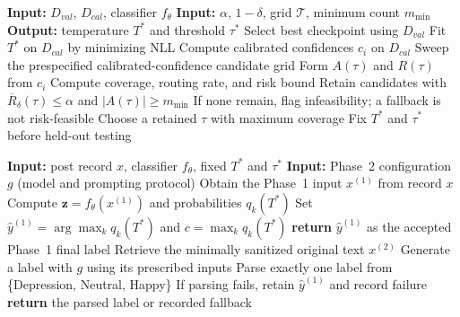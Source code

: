 \documentclass{ieeeaccess}
\begin{document}
\begin{algorithm}[t]
\caption{Calibrated confidence-guided routing}
\label{alg:confidence-routing}
\footnotesize
\begin{algorithmic}[1]
\State \textbf{Input:} $D_{val}$, $D_{cal}$, classifier $f_{\theta}$
\State \textbf{Input:} $\alpha$, $1-\delta$, grid $\mathcal{T}$, minimum count $m_{\min}$
\State \textbf{Output:} temperature $T^*$ and threshold $\tau^*$
\State Select best checkpoint using $D_{val}$
\State Fit $T^*$ on $D_{cal}$ by minimizing NLL
\State Compute calibrated confidences $c_i$ on $D_{cal}$
\State Sweep the prespecified calibrated-confidence candidate grid
    \State Form $A(\tau)$ and $R(\tau)$ from $c_i$
    \State Compute coverage, routing rate, and risk bound
\EndFor
\State Retain candidates with $\overline{R}_{\delta}(\tau)\leq\alpha$ and $|A(\tau)|\geq m_{\min}$
\State If none remain, flag infeasibility; a fallback is not risk-feasible
\State Choose a retained $\tau$ with maximum coverage
\State Fix $T^*$ and $\tau^*$ before held-out testing
\end{algorithmic}
\end{algorithm}

\begin{algorithm}[t]
\caption{Two-phase inference with fixed calibrated routing policy}
\label{alg:two-phase-inference}
\footnotesize
\begin{algorithmic}[1]
\State \textbf{Input:} post record $x$, classifier $f_{\theta}$, fixed $T^*$ and $\tau^*$
\State \textbf{Input:} Phase~2 configuration $g$ (model and prompting protocol)
\State Obtain the Phase~1 input $x^{(1)}$ from record $x$
\State Compute $\mathbf{z}=f_{\theta}(x^{(1)})$ and probabilities $q_k(T^*)$
\State Set $\hat{y}^{(1)}=\arg\max_k q_k(T^*)$ and $c=\max_k q_k(T^*)$
    \State \textbf{return} $\hat{y}^{(1)}$ as the accepted Phase~1 final label
\Else
    \State Retrieve the minimally sanitized original text $x^{(2)}$
    \State Generate a label with $g$ using its prescribed inputs
    \State Parse exactly one label from \{Depression, Neutral, Happy\}
    \State If parsing fails, retain $\hat{y}^{(1)}$ and record failure
    \State \textbf{return} the parsed label or recorded fallback
\EndIf
\end{algorithmic}
\end{algorithm}
\end{document}
